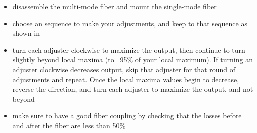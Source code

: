 \begin{itemize}
  \item disassemble the multi-mode fiber and mount the single-mode fiber
  \item choose an sequence to make your adjustments, and keep to that sequence as shown in 
  \item turn each adjuster clockwise to maximize the output, then continue to turn slightly beyond local maxima (to ~95\% of your local maximum). If turning an adjuster clockwise decreases output, skip that adjuster for that round of adjustments and repeat. Once the local maxima values begin to decrease, reverse the direction, and turn each adjuster to maximize the output, and not beyond
  \item make sure to have a good fiber coupling by checking that the losses before and after the fiber are less than 50\%
\end{itemize}
